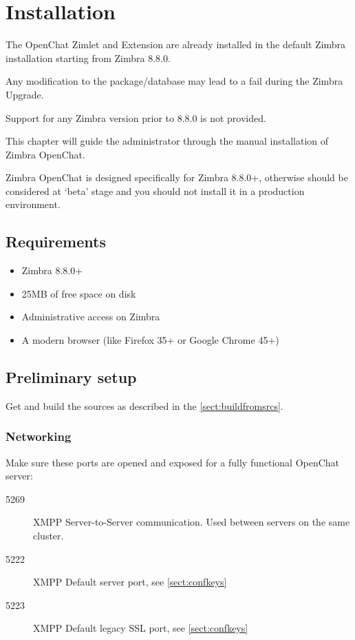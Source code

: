 \chapter{Installation}

\begin{warning}
    The OpenChat Zimlet and Extension are already installed in the default Zimbra installation starting from Zimbra 8.8.0.

    Any modification to the package/database may lead to a fail during the Zimbra Upgrade.

    Support for any Zimbra version prior to 8.8.0 is not provided.
\end{warning}

This chapter will guide the administrator through the manual installation of Zimbra OpenChat.

Zimbra OpenChat is designed specifically for Zimbra 8.8.0+, otherwise should be considered at `beta'
stage and you should not install it in a production environment.

\section{Requirements}
    \begin{itemize}
        \item Zimbra 8.8.0+
        \item 25MB of free space on disk
        \item Administrative access on Zimbra
        \item A modern browser (like Firefox 35+ or Google Chrome 45+)
    \end{itemize}

\section{Preliminary setup}

    Get and build the sources as described in the \autoref{sect:buildfromsrcs}.

\subsection{Networking}

    Make sure these ports are opened and exposed for a fully functional OpenChat server:
    \begin{description}
        \item [5269] XMPP Server-to-Server communication. Used between servers on the same cluster.
        \item [5222] XMPP Default server port, see \autoref{sect:confkeys}
        \item [5223] XMPP Default legacy SSL port, see \autoref{sect:confkeys}
    \end{description}

